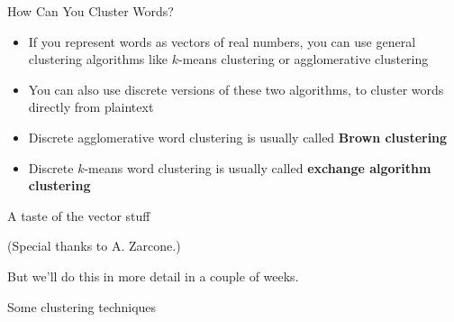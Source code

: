 \documentclass[xcolor=pdftex,x11names,table,hyperref]{beamer}
\begin{document}
\begin{frame}{How Can You Cluster Words?}
\begin{itemize}
	\item If you represent words as vectors of real numbers, you can use general clustering algorithms like $k$-means clustering or agglomerative clustering
	\pause
	\item You can also use discrete versions of these two algorithms, to cluster words directly from plaintext
	\pause
	\item Discrete agglomerative word clustering is usually called \textbf{Brown clustering}
	\item Discrete $k$-means word clustering is usually called \textbf{exchange algorithm clustering}
\end{itemize}
\end{frame}

\begin{frame}{A taste of the vector stuff}
  \begin{center}

    \hfill {\tiny (Special thanks to A. Zarcone.)}
  \end{center}
  \vspace{-0.3cm}
  But we'll do this in more detail in a couple of weeks.
\end{frame}

\begin{frame}{Some clustering techniques}
	\hspace*{-19.0em}%
	\scalebox{0.77}{%
		
	}%
\end{frame}
\end{document}
